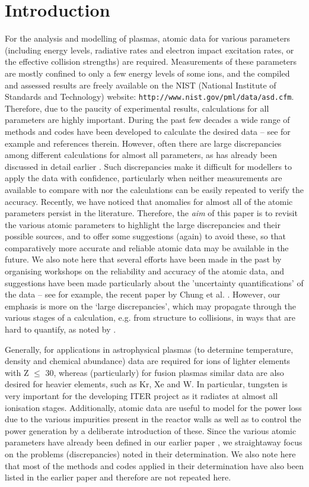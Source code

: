 \documentclass[fleqn]{article}
\begin{document}
\section{Introduction}
For the analysis and modelling of plasmas, atomic data for various parameters (including energy levels, radiative rates and electron impact excitation rates, or the effective collision strengths) are required. Measurements of these parameters  are mostly confined to only a few energy levels of some ions, and the compiled and assessed results are freely available on the NIST (National Institute of Standards and Technology) website: {\tt http://www.nist.gov/pml/data/asd.cfm}. Therefore, due to the paucity of experimental results,   calculations for all parameters are highly important. During the past few decades a wide range of methods and codes have been developed to calculate the desired data -- see for example \cite{fst} and references therein. However, often there are large discrepancies among different calculations for almost all parameters, as has already been discussed in detail earlier \cite{fst}. Such discrepancies  make it difficult for modellers to apply the data with confidence, particularly when neither measurements are available to compare with nor the calculations can be easily repeated to verify the accuracy.  Recently,  we have noticed that  anomalies for almost all of the atomic parameters persist in the literature. Therefore, the {\em aim} of this paper is to revisit the various atomic parameters to highlight the large discrepancies and their possible sources,  and to offer some suggestions (again) to avoid these,  so that comparatively more accurate and reliable atomic data may be available in the future. We also note here that several efforts have been made in the past by organising workshops on the reliability and accuracy of the atomic data, and suggestions have been made particularly about the 'uncertainty quantifications' of the data -- see for example, the recent paper by Chung et al. \cite{iaea}. However, our emphasis is more on the `large discrepancies', which may  propagate through the various stages of  a calculation, e.g. from structure to collisions, in ways that are  hard to quantify, as noted by \cite{iaea}.

Generally, for applications in astrophysical plasmas (to determine temperature, density and  chemical abundance) data are required for ions of lighter elements with Z $\le$ 30, whereas (particularly) for fusion plasmas  similar data  are also desired for heavier elements, such as Kr, Xe and W. In particular, tungsten is very important for the developing ITER project as it radiates at almost all ionisation stages. Additionally, atomic data are useful to model for the power loss due to the various impurities present in the reactor walls as well as to control the power generation by a deliberate introduction of these. Since the various atomic parameters have already been defined in our earlier paper \cite{fst}, we straightaway focus on the problems (discrepancies) noted in their determination. We also note here that most of the methods and codes applied in their determination have also been listed in the earlier paper and therefore are not repeated here.
\end{document}
